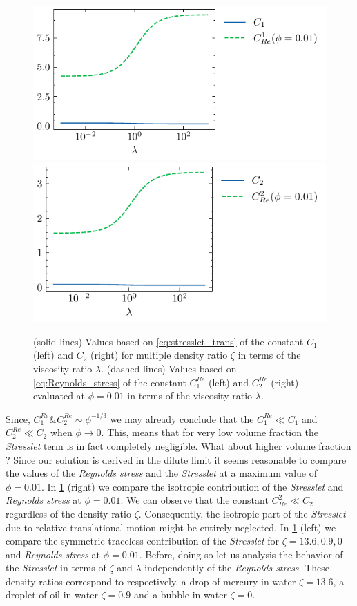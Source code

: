 \begin{figure}
    \includegraphics[height=0.25\textwidth]{image/Theory/C1.pdf}
    \includegraphics[height=0.25\textwidth]{image/Theory/C2.pdf}
    \caption{
    (solid lines) Values based on \ref{eq:stresslet_trans} of the constant $C_1$ (left)  and $C_2$ (right) for multiple density ratio $\zeta$ in terms of the viscosity ratio $\lambda$.
    (dashed lines) Values based on \ref{eq:Reynolds_stress} of the constant $C_1^{Re}$ (left) and $C_2^{Re}$ (right)  evaluated at $\phi = 0.01$ in terms of the viscosity ratio $\lambda$.
    }
    \label{fig:relative_comparaison}
\end{figure}
Since, $C_1^{Re} \& C_2^{Re} \sim \phi^{-1/3}$ we may already conclude that the $C_1^{Re} \ll C_1$ and $C_2^{Re} \ll C_2$ when $\phi \to 0$. 
This, means that for very low volume fraction the \textit{Stresslet} term  is in fact completely negligible. 
What about higher volume fraction ? 
Since our solution is derived in the dilute limit it seems reasonable to compare the values of the \textit{Reynolds stress} and the \textit{Stresslet} at a maximum value of $\phi = 0.01$. 
In \ref{fig:relative_comparaison} (right) we compare the isotropic contribution of the \textit{Stresslet} and \textit{Reynolds stress} at $\phi =0.01$. 
We can observe that the constant $C_{Re}^2 \ll C_2$ regardless of the density ratio $\zeta$. 
Consequently, the isotropic part of the \textit{Stresslet} due to relative translational motion might be entirely neglected. 
In \ref{fig:relative_comparaison} (left) we compare the symmetric traceless contribution of the \textit{Stresslet} for $\zeta = 13.6,0.9,0$ and \textit{Reynolds stress} at $\phi =0.01$. 
Before, doing so let us analysis the behavior of the \textit{Stresslet} in terms of $\zeta$ and $\lambda$ independently of the \textit{Reynolds stress}. 
These density ratios correspond to respectively, a drop of mercury in water $\zeta = 13.6$, a droplet of oil in water $\zeta = 0.9$ and a bubble in water $\zeta = 0$. 

